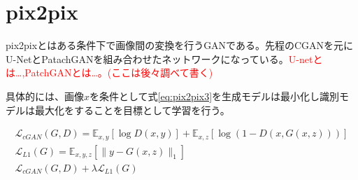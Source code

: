 \section{pix2pix}

pix2pixとはある条件下で画像間の変換を行うGANである。先程のCGANを元にU-NetとPatachGANを組み合わせたネットワークになっている。\textcolor{red}{U-netとは…,PatchGANとは…。(ここは後々調べて書く)}\par
具体的には、画像$x$を条件として式\ref{eq:pix2pix3}を生成モデルは最小化し識別モデルは最大化をすることを目標として学習を行う\cite{pix2pix}。

\begin{align}
    \mathcal{L}_{cGAN}(G, D)=\mathbb{E}_{x, y}[\log D(x, y)]+\mathbb{E}_{x, z}[\log (1-D(x, G(x, z)))] \label{eq:pix2pix1}\\
    \mathcal{L}_{L 1}(G)=\mathbb{E}_{x, y, z}\left[\|y-G(x, z)\|_{1}\right] \label{peq:ix2pix2}\\
    \mathcal{L}_{c G A N}(G, D)+\lambda \mathcal{L}_{L 1}(G) \label{eq:pix2pix3}
\end{align}

